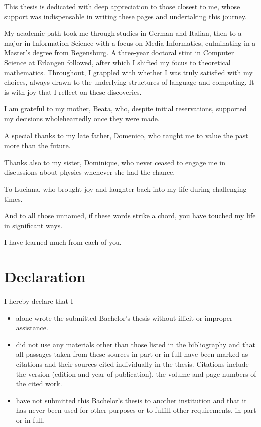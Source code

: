 \documentclass[b5paper, 12pt, twoside]{report}
\begin{document}
	This thesis is dedicated with deep appreciation to those closest to me, whose
	support was indispensable in writing these pages and undertaking this journey.

	My academic path took me through studies in German and Italian, then to a major
	in Information Science with a focus on Media Informatics, culminating in a
	Master’s degree from Regensburg. A three-year doctoral stint in Computer Science
	at Erlangen followed, after which I shifted my focus to theoretical
	mathematics. Throughout, I grappled with whether I was truly satisfied with my
	choices, always drawn to the underlying structures of language and computing.
	It is with joy that I reflect on these discoveries.

	I am grateful to my mother, Beata, who, despite initial reservations,
	supported my decisions wholeheartedly once they were made.

	A special thanks to my late father, Domenico, who taught me to value the past
	more than the future.

	Thanks also to my sister, Dominique, who never ceased to engage me in
	discussions about physics whenever she had the chance.

	To Luciana, who brought joy and laughter back into my life during challenging times.

	And to all those unnamed, if these words strike a chord, you have touched my life
	in significant ways.

	I have learned much from each of you.

	\chapter*{Declaration}

	I hereby declare that I

	\begin{itemize}
		\item alone wrote the submitted Bachelor's thesis without illicit or improper
			assistance.

		\item did not use any materials other than those listed in the bibliography and
			that all passages taken from these sources in part or in full have been marked
			as citations and their sources cited individually in the thesis. Citations
			include the version (edition and year of publication), the volume and page
			numbers of the cited work.

		\item have not submitted this Bachelor's thesis to another institution and that
			it has never been used for other purposes or to fulfill other requirements,
			in part or in full.
	\end{itemize}
\end{document}
